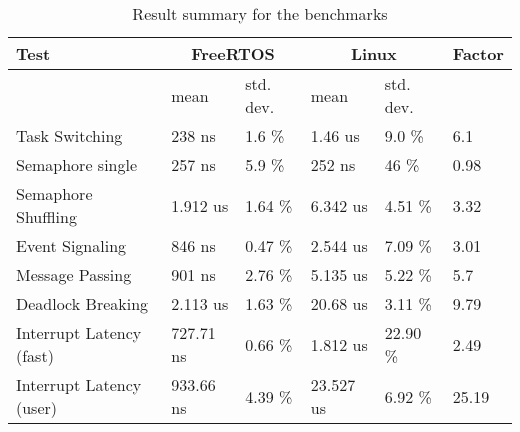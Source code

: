 \begin{table}[htbp]
	\centering
		\begin{tabular}{|l||l|l||l|l||l|}
			\hline
				Test & \multicolumn{2}{|c||}{FreeRTOS} & \multicolumn{2}{|c||}{Linux}	& Factor				 	 \\
				\hline 
																	& mean			 & std. dev. 		 & mean			  & std. dev. 	&			 \\
				\hline 
				Task Switching						& 238 ns	 	 & 1.6 \%		 		 & 1.46 us	  & 9.0 \%			&	6.1	 \\
			  \hline
			  Semaphore single				  & 257 ns		 & 5.9 \%  			 & 252 ns		  &	46 \% 			&	0.98 \\
			  \hline 
			  Semaphore Shuffling 			& 1.912 us 	 & 1.64 \% 			 & 6.342 us  	&	4.51 \%			&	3.32 \\ 
			  \hline
			  Event Signaling						& 846 ns		 & 0.47 \% 			 & 2.544 us		& 7.09 \%			&	3.01 \\
			  \hline
			  Message Passing						& 901 ns		 & 2.76 \% 			 & 5.135 us		& 5.22 \%			&	5.7  \\
			  \hline
			  Deadlock Breaking					& 2.113 us	 & 1.63 \% 			 & 20.68 us		& 3.11 \%			&	9.79 \\
			  \hline
			  Interrupt Latency (fast)	& 727.71 ns	 & 0.66 \% 			 & 1.812 us		& 22.90 \%		&	2.49 \\
			  \hline
			  Interrupt Latency (user)	& 933.66 ns	 & 4.39 \% 			 & 23.527 us	& 6.92 \%			&	25.19 \\
			\hline
		\end{tabular}
	\caption{Result summary for the benchmarks}
	\label{tab_summary}
\end{table}
 





